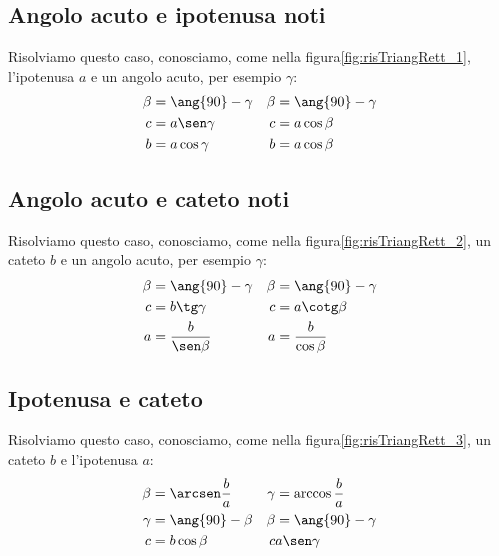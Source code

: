 \subsection{Angolo acuto e ipotenusa noti}
Risolviamo questo caso, conosciamo, come nella figura\nobs\vref*{fig:risTriangRett_1}, l'ipotenusa $a$ e un angolo acuto, per esempio $\gamma$:
\begin{align*}
\beta&=\ang{90}-\gamma&\beta&=\ang{90}-\gamma\\
c&=a\sen\gamma&c&=a\cos\beta\\
b&=a\cos\gamma&b&=a\cos\beta
\end{align*}
\subsection{Angolo acuto e cateto noti}
Risolviamo questo caso, conosciamo, come nella figura\nobs\vref*{fig:risTriangRett_2}, un cateto $b$ e un angolo acuto, per esempio $\gamma$:
\begin{align*}
\beta&=\ang{90}-\gamma&\beta&=\ang{90}-\gamma\\
c&=b\tg\gamma&c&=a\cotg\beta\\
a&=\dfrac{b}{\sen\beta}&a&=\dfrac{b}{\cos\beta}
\end{align*}
\subsection{Ipotenusa e cateto}
Risolviamo questo caso, conosciamo, come nella figura\nobs\vref*{fig:risTriangRett_3}, un cateto $b$ e l'ipotenusa $a$:
\begin{align*}
\beta&=\arcsen\dfrac{b}{a}&\gamma&=\arccos\dfrac{b}{a}\\
\gamma&=\ang{90}-\beta&\beta&=\ang{90}-\gamma\\
c&=b\cos\beta&c&a\sen\gamma
\end{align*}
